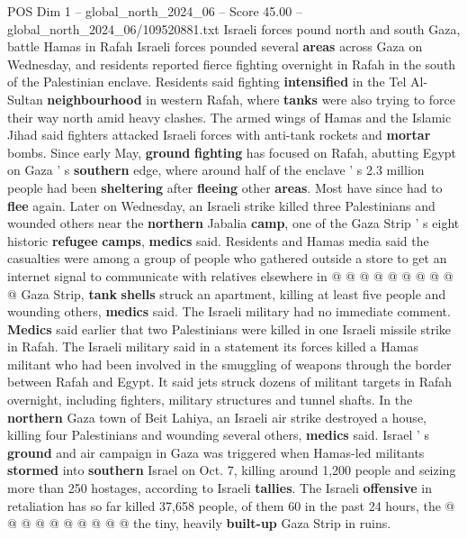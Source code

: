 \begin{textsample}{POS Dim 1 – global\_north\_2024\_06 – Score 45.00 – global\_north\_2024\_06/109520881.txt}  \label{ex:f1_pos_232}
Israeli forces pound north and south Gaza, battle Hamas in Rafah Israeli forces pounded several \textbf{areas} across Gaza on Wednesday, and residents reported fierce fighting overnight in Rafah in the south of the Palestinian enclave.
Residents said fighting \textbf{intensified} in the Tel Al-Sultan \textbf{neighbourhood} in western Rafah, where \textbf{tanks} were also trying to force their way north amid heavy clashes.
The armed wings of Hamas and the Islamic Jihad said fighters attacked Israeli forces with anti-tank rockets and \textbf{mortar} bombs.
Since early May, \textbf{ground} \textbf{fighting} has focused on Rafah, abutting Egypt on Gaza ' s \textbf{southern} edge, where around half of the enclave ' s 2.3 million people had been \textbf{sheltering} after \textbf{fleeing} other \textbf{areas}.
Most have since had to \textbf{flee} again.
Later on Wednesday, an Israeli strike killed three Palestinians and wounded others near the \textbf{northern} Jabalia \textbf{camp}, one of the Gaza Strip ' s eight historic \textbf{refugee} \textbf{camps}, \textbf{medics} said.
Residents and Hamas media said the casualties were among a group of people who gathered outside a store to get an internet signal to communicate with relatives elsewhere in @ @ @ @ @ @ @ @ @ @ Gaza Strip, \textbf{tank} \textbf{shells} struck an apartment, killing at least five people and wounding others, \textbf{medics} said.
The Israeli military had no immediate comment. \textbf{Medics} said earlier that two Palestinians were killed in one Israeli missile strike in Rafah.
The Israeli military said in a statement its forces killed a Hamas militant who had been involved in the smuggling of weapons through the border between Rafah and Egypt.
It said jets struck dozens of militant targets in Rafah overnight, including fighters, military structures and tunnel shafts.
In the \textbf{northern} Gaza town of Beit Lahiya, an Israeli air strike destroyed a house, killing four Palestinians and wounding several others, \textbf{medics} said.
Israel ' s \textbf{ground} and air campaign in Gaza was triggered when Hamas-led militants \textbf{stormed} into \textbf{southern} Israel on Oct. 7, killing around 1,200 people and seizing more than 250 hostages, according to Israeli \textbf{tallies}.
The Israeli \textbf{offensive} in retaliation has so far killed 37,658 people, of them 60 in the past 24 hours, the @ @ @ @ @ @ @ @ @ @ the tiny, heavily \textbf{built-up} Gaza Strip in ruins.

\end{textsample}
